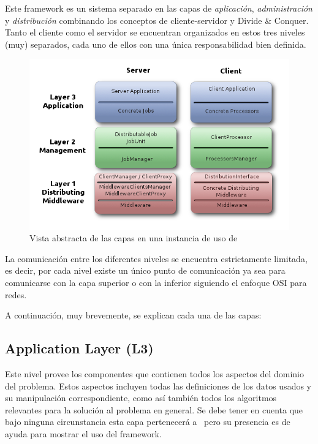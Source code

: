     Este framework es un sistema separado en las capas de \textit{aplicaci\'on}, 
    \textit{administraci\'on} y \textit{distribuci\'on} combinando los conceptos de cliente-servidor y Divide \& Conquer. Tanto el cliente como el
    servidor se encuentran organizados en estos tres niveles (muy) separados, cada uno de ellos con una \'unica responsabilidad bien definida.
    \begin{figure}[H] \hspace{.60cm}
      \includegraphics[scale=.51]{images/AbstractLayers.png}
      \caption{Vista abstracta de las capas en una instancia de uso de \fud} \label{disenioFud}
    \end{figure}
    La comunicaci\'on entre los diferentes niveles se encuentra estrictamente limitada, es decir, por cada nivel existe un \'unico punto de comunicaci\'on 
    ya sea para comunicarse con la capa superior o con la inferior siguiendo el enfoque OSI para redes.
    
    A continuaci\'on, muy brevemente, se explican cada una de las capas:
    \subsection{Application Layer (L3)}
    Este nivel provee los componentes que contienen todos los aspectos del dominio del problema. Estos aspectos incluyen todas las definiciones de los
    datos usados y su manipulaci\'on correspondiente, como as\'i tambi\'en todos los algoritmos relevantes para la soluci\'on al problema en general. Se debe
    tener en cuenta que bajo ninguna circunstancia esta capa pertenecer\'a a \fud \ pero su presencia es de ayuda para mostrar el uso del framework.

